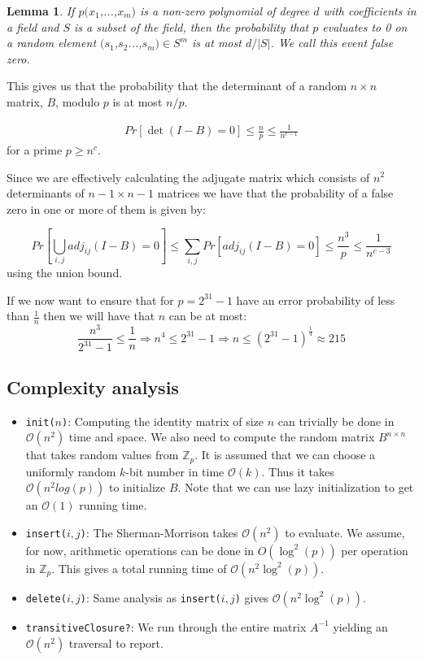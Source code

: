 \documentclass[a4paper,oneside,article,11pt]{memoir}
\newtheorem{lemma}{Lemma}
\begin{document}
\begin{lemma}
\label{lma:zippelSchwarz}
If $p(x_1$,...,$x_m)$ is a non-zero polynomial of degree $d$ with coefficients in a field and $S$ is a subset of the field, then the probability that $p$ evaluates to 0 on a random element $(s_1$,$s_2$...,$s_m) \in S^m$ is at most $d/\rvert S \rvert$. We call this event false zero.
\end{lemma}

This gives us that the probability that the determinant of a random $n \times n$ matrix, $B$, modulo $p$ is at most $n/p$.

\begin{align}
\label{error-prob}
Pr\left[ \det(I-B)  = 0\right] \leq \frac{n}{p} \leq \frac{1}{n^{c-1}}
\end{align}
for a prime $p \geq n^c$.

Since we are effectively calculating the adjugate matrix which consists of $n^2$ determinants of $n-1 \times n-1$ matrices we have that the probability of a false zero in one or more of them is given by:

$$Pr\left[ \bigcup\limits_{i,j} adj_{ij}(I-B) = 0\right] \leq \sum\limits_{i,j}Pr\left[adj_{ij}(I-B) = 0\right] \leq \frac{n^3}{p} \leq \frac{1}{n^{c-3}}$$
using the union bound.

If we now want to ensure that for $p = 2^{31}-1$ have an error probability of less than $\frac{1}{n}$ then we will have that $n$ can be at most:
$$\frac{n^3}{2^{31}-1} \leq \frac{1}{n} \Rightarrow n^4 \leq 2^{31}-1 \Rightarrow n \leq (2^{31}-1)^{\frac{1}{4}} \approx 215$$


\subsection{Complexity analysis}

\begin{itemize}
\item{\texttt{init($n$)}: Computing the identity matrix of size $n$ can trivially be done in $\mathcal{O}(n^2)$ time and space. We also need to compute the random matrix $B^{n \times n}$ that takes random values from $\mathbb{Z}_p$. It is assumed that we can choose a uniformly random $k$-bit number in time $\mathcal{O}(k)$. Thus it takes $\mathcal{O}(n^2 log(p))$ to initialize $B$. Note that we can use lazy initialization to get an $\mathcal{O}(1)$ running time.}
\item{\texttt{insert($i,j$)}: The Sherman-Morrison takes $\mathcal{O}(n^2)$ to evaluate. We assume, for now, arithmetic operations can be done in $O(\log^2(p))$ per operation in $\mathbb{Z}_p$. This gives a total running time of $\mathcal{O}(n^2 \log^2(p))$.}
\item{\texttt{delete($i,j$)}: Same analysis as \texttt{insert($i,j$)} gives $\mathcal{O}(n^2 \log^2(p))$.}
\item{\texttt{transitiveClosure?}: We run through the entire matrix $A^{-1}$ yielding an $\mathcal{O}(n^2)$ traversal to report.}
\end{itemize}
\end{document}
